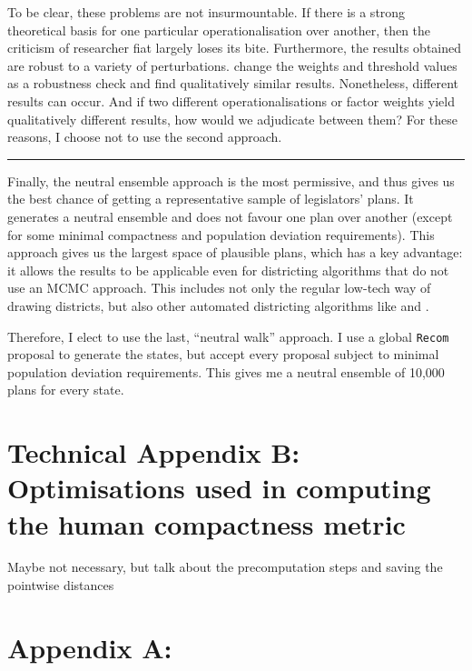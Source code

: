 \documentclass[]{article}
\begin{document}
To be clear, these problems are not insurmountable. If there is a strong
theoretical basis for one particular operationalisation over another,
then the criticism of researcher fiat largely loses its bite.
Furthermore, the results obtained are robust to a variety of
perturbations. \cite{h2018} change the weights and threshold values as a
robustness check and find qualitatively similar results. Nonetheless,
different results can occur. And if two different operationalisations or
factor weights yield qualitatively different results, how would we
adjudicate between them? For these reasons, I choose not to use the
second approach.

\begin{center}\rule{0.5\linewidth}{\linethickness}\end{center}

Finally, the neutral ensemble approach is the most permissive, and thus
gives us the best chance of getting a representative sample of
legislators' plans. It generates a neutral ensemble and does not favour
one plan over another (except for some minimal compactness and
population deviation requirements). This approach gives us the largest
space of plausible plans, which has a key advantage: it allows the
results to be applicable even for districting algorithms that do not use
an MCMC approach. This includes not only the regular low-tech way of
drawing districts, but also other automated districting algorithms like
\cite{mm2018} and \cite{lf2019}.

Therefore, I elect to use the last, ``neutral walk'' approach. I use a
global \texttt{Recom} proposal to generate the states, but accept every
proposal subject to minimal population deviation requirements. This
gives me a neutral ensemble of 10,000 plans for every state.

\hypertarget{technical-appendix-b-optimisations-used-in-computing-the-human-compactness-metric}{%
\section{Technical Appendix B: Optimisations used in computing the human
compactness
metric}\label{technical-appendix-b-optimisations-used-in-computing-the-human-compactness-metric}}

Maybe not necessary, but talk about the precomputation steps and saving
the pointwise distances

\hypertarget{appendix-a}{%
\section{Appendix A:}\label{appendix-a}}
\end{document}
